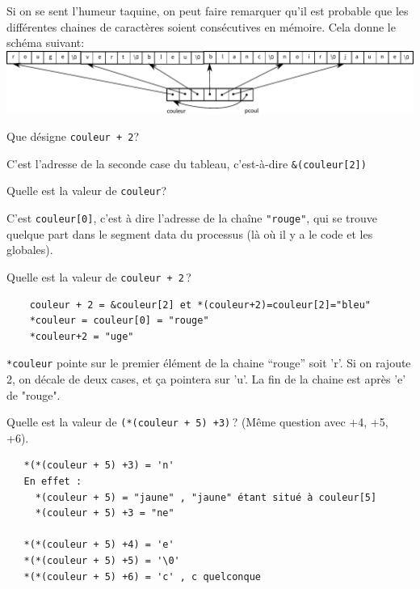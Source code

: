 \documentclass[10pt]{article}\usepackage[nu,correction]{esial}
\begin{document}
\begin{Reponse}
  Si on se sent l'humeur taquine, on peut faire remarquer qu'il est
  probable que les différentes chaines de caractères soient
  consécutives en mémoire. Cela donne le schéma suivant:\\

  \noindent
  \includegraphics[width=\linewidth]{memoire-couleur2.pdf}
\end{Reponse}

\Question Que  désigne {\tt couleur + 2}?

\begin{Reponse}
  C'est l'adresse de la seconde case du tableau, c'est-à-dire
  \verb|&(couleur[2])|
\end{Reponse}

\Question Quelle est la valeur de {\tt *couleur}?

\begin{Reponse}
  C'est \verb|couleur[0]|, c'est à dire l'adresse de la chaîne
  \texttt{"rouge"}, qui se trouve quelque part dans le segment data du
  processus (là où il y a le code et les globales).
\end{Reponse}

\Question Quelle est la valeur de {\tt *couleur + 2}\,?

\begin{Reponse}
\begin{verbatim} 
    couleur + 2 = &couleur[2] et *(couleur+2)=couleur[2]="bleu"
    *couleur = couleur[0] = "rouge"
    *couleur+2 = "uge"
\end{verbatim}

\noindent\verb?*couleur? pointe sur le premier élément de la chaine ``rouge''
soit 'r'. Si on rajoute 2, on décale de deux cases, et ça pointera sur
'u'. La fin de la chaine est après 'e' de "rouge".
\end{Reponse}

\Question Quelle est la valeur de {\tt *(*(couleur + 5) +3)}\,? (Même
question avec +4, +5, +6).

\begin{Reponse}
\begin{verbatim} 
   *(*(couleur + 5) +3) = 'n' 
   En effet : 
     *(couleur + 5) = "jaune" , "jaune" étant situé à couleur[5] 
     *(couleur + 5) +3 = "ne"

   *(*(couleur + 5) +4) = 'e' 
   *(*(couleur + 5) +5) = '\0' 
   *(*(couleur + 5) +6) = 'c' , c quelconque 
\end{verbatim}
~
\end{Reponse}
\end{document}

